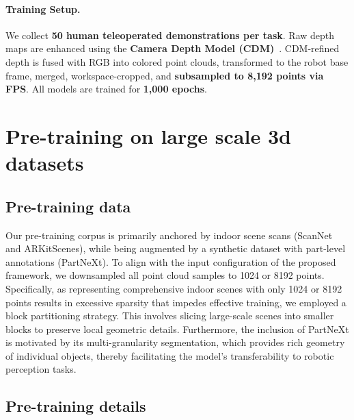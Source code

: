 \documentclass[runningheads]{llncs}
\begin{document}
\paragraph{Training Setup.}
We collect \textbf{50 human teleoperated demonstrations per task}. Raw depth maps are enhanced using the \textbf{Camera Depth Model (CDM)}~\cite{liu2025manipulation}. CDM-refined depth is fused with RGB into colored point clouds, transformed to the robot base frame, merged, workspace-cropped, and \textbf{subsampled to 8,192 points via FPS}. All models are trained for \textbf{1,000 epochs}.



\section{Pre-training on large scale 3d datasets}

\subsection{Pre-training data}

Our pre-training corpus is primarily anchored by indoor scene scans (ScanNet\cite{dai2017scannet} and ARKitScenes\cite{baruch2021arkitscenes}), while being augmented by a synthetic dataset with part-level annotations (PartNeXt\cite{wangpartnext}). To align with the input configuration of the proposed framework, we downsampled all point cloud samples to 1024 or 8192 points. Specifically, as representing comprehensive indoor scenes with only 1024 or 8192 points results in excessive sparsity that impedes effective training, we employed a block partitioning strategy. This involves slicing large-scale scenes into smaller blocks to preserve local geometric details. Furthermore, the inclusion of PartNeXt is motivated by its multi-granularity segmentation, which provides rich geometry of individual objects, thereby facilitating the model's transferability to robotic perception tasks.

\subsection{Pre-training details}
\end{document}
